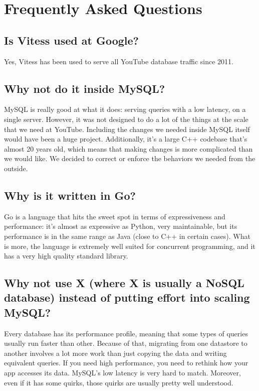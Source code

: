 \section{Frequently Asked Questions}\label{Vitess-FAQ}

\subsection{Is Vitess used at Google?}\label{is-vitess-used-at-google}

Yes, Vitess has been used to serve all YouTube database traffic since
2011.

\subsection{Why not do it inside MySQL?}\label{why-not-do-it-inside-mysql}

MySQL is really good at what it does: serving queries with a low
latency, on a single server. However, it was not designed to do a lot
of the things at the scale that we need at YouTube. Including the
changes we needed inside MySQL itself would have been a huge
project. Additionally, it’s a large C++ codebase that’s almost 20
years old, which means that making changes is more complicated than we
would like. We decided to correct or enforce the behaviors we
needed from the outside.

\subsection{Why is it written in Go?}\hypertarget{why-is-it-written-in-go}{}\label{why-is-it-written-in-go}

Go is a language that hits the sweet spot in terms of expressiveness
and performance: it’s almost as expressive as Python, very
maintainable, but its performance is in the same range as Java (close
to C++ in certain cases). What is more, the language is extremely well
suited for concurrent programming, and it has a very high quality
standard library.

\subsection{Why not use X (where X is usually a NoSQL database) instead of putting effort into scaling MySQL?}\label{why-not-use-x-where-x-is-usually-a-nosql-database-instead-of-putting-effort-into-scaling-mysql}

Every database has its performance profile, meaning that some types of
queries usually run faster than other. Because of that, migrating from
one datastore to another involves a lot more work than just copying
the data and writing equivalent queries. If you need high performance,
you need to rethink how your app accesses its data. MySQL’s low
latency is very hard to match. Moreover, even if it has some quirks,
those quirks are usually pretty well understood.

